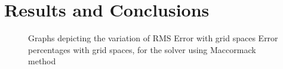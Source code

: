 \documentclass[a4paper]{report}
\begin{document}
	\newpage	

	\section{Results and Conclusions}
	\begin{figure}[htb!]		
		
		\caption{Graphs depicting the variation of  RMS Error with grid spaces  Error percentages with grid spaces, for the solver using Maccormack method}
		\label{M_graphs}	
	\end{figure}
\end{document}
